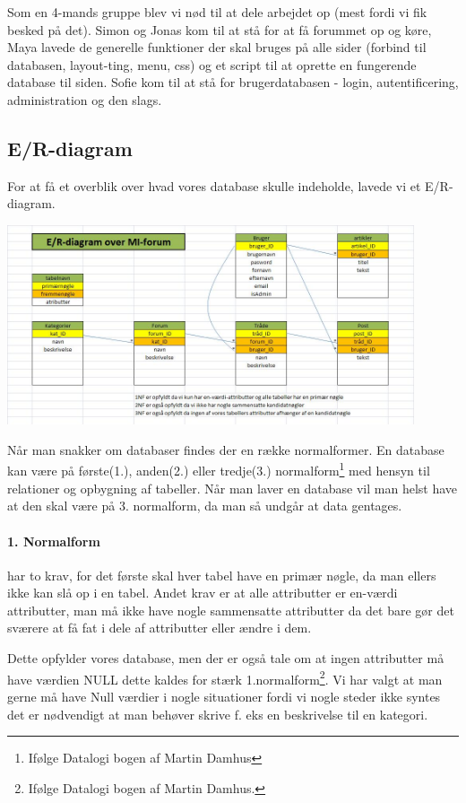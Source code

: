 \documentclass{article}
\begin{document}
Som en 4-mands gruppe blev vi nød til at dele arbejdet op (mest fordi vi fik besked på det). Simon og Jonas kom til at stå for at få forummet op og køre, Maya lavede de generelle funktioner der skal bruges på alle sider (forbind til databasen, layout-ting, menu, css) og et script til at oprette en fungerende database til siden. Sofie kom til at stå for brugerdatabasen - login, autentificering, administration og den slags.

\subsection{E/R-diagram}
For at få et overblik over hvad vores database skulle indeholde, lavede vi et E/R-diagram.

\includegraphics[width=120mm]{er-diag.jpg}

Når man snakker om databaser findes der en række normalformer. En database kan være på første(1.), anden(2.) eller tredje(3.) normalform\footnote{Ifølge Datalogi bogen af Martin Damhus} med hensyn til relationer og opbygning af tabeller. Når man laver en database vil man helst have at den skal være på 3. normalform, da man så undgår at data gentages.

\paragraph{1. Normalform}
har to krav, for det første skal hver tabel have en primær nøgle, da man ellers ikke kan slå op i en tabel. Andet krav er at alle attributter er en-værdi attributter, man må ikke have nogle sammensatte attributter da det bare gør det sværere at få fat i dele af attributter eller ændre i dem.

Dette opfylder vores database, men der er også tale om at ingen attributter må have værdien NULL dette kaldes for stærk 1.normalform\footnote{Ifølge Datalogi bogen af Martin Damhus.}. Vi har valgt at man gerne må have Null værdier i nogle situationer fordi vi nogle steder ikke syntes det er nødvendigt at man behøver skrive f. eks en beskrivelse til en kategori.
\end{document}

